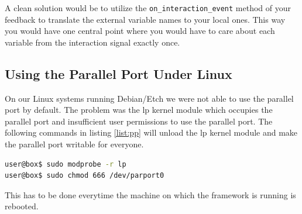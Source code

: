 A clean solution would be to utilize the \lstinline+on_interaction_event+ method of your feedback to translate the external variable names to your local ones. This way you would have one central point where you would have to care about each variable from the interaction signal exactly once.

\subsection{Using the Parallel Port Under Linux}
\label{sec:pp-linux}
On our Linux systems running Debian/Etch we were not able to use the parallel port by default. The problem was the lp kernel module which occupies the parallel port and insufficient user permissions to use the parallel port. The following commands in listing \ref{list:pp} will unload the lp kernel module and make the parallel port writable for everyone.
\begin{lstlisting}[language=bash, caption=Making the parallel port available on Debian/Etch, label={list:pp}]
user@box$ sudo modprobe -r lp
user@box$ sudo chmod 666 /dev/parport0
\end{lstlisting}
This has to be done everytime the machine on which the framework is running is rebooted.

